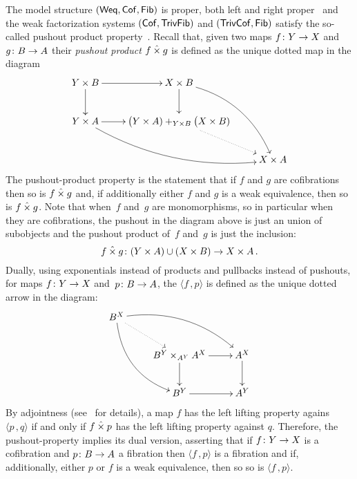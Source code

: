 \documentclass[reqno,10pt,a4paper,oneside,draft]{amsart}
\begin{document}
The model structure $(\mathsf{Weq}, \mathsf{Cof}, \mathsf{Fib})$ is proper, \ie both left and right proper~\cite[???]{henry2019qms}
and the weak factorization systems $(\mathsf{Cof}, \mathsf{TrivFib})$ and $(\mathsf{TrivCof}, \mathsf{Fib})$
satisfy the so-called pushout product property~\cite[???]{henry2018wms}. Recall that, given two maps $f \colon Y \rightarrow X$ and $g \colon B \rightarrow A$ their \emph{pushout product} $f \mathbin{\hat{\times}} g$ is defined as the unique dotted map in the diagram
\[
\xymatrix{
Y \times B \ar[r] \ar[d] &  X \times B \ar[d] \ar@/^1.5pc/[ddr] \\
Y \times A \ar[r]  \ar@/_1.5pc/[drr] & \displaystyle \big( Y \times A ) +_{Y \times B} \big( X \times B ) \ar@{.>}[dr]  \\
 & & X \times A }
 \]
The pushout-product property is  the statement that  if $f$ and $g$ are cofibrations then so is $f \mathbin{\hat{\times}} g$
and, if additionally either $f$ and $g$ is a weak equivalence, then so is $f \mathbin{\hat{\times}} g$.
Note that when~$f$ and~$g$ are monomorphisms, so in particular when they are cofibrations, the pushout in the diagram above is just an union of subobjects and the pushout product of~$f$ and~$g$ is just the inclusion:
\[  
f \mathbin{\hat{\times}} g \colon (Y \times A) \cup (X \times B) \rightarrow X \times A \, .
\]
Dually, using  exponentials instead of products and pullbacks instead of pushouts, for maps $f \colon Y \rightarrow X$ and~$p \colon B \rightarrow A$, the   $\langle f \, , p \rangle$ is defined as the unique dotted arrow in the diagram:
\[
\xymatrix{
 B^X \ar@{.>}[dr] \ar@/^1.5pc/[drr] \ar@/_1.5pc/[ddr] \\
& B^Y \times_{A^Y} A^X \ar[r] \ar[d] &  A^X \ar[d]  \\
& B^Y \ar[r] & A^Y  \\
 }
 \]
By adjointness (see~\cite{joyal-tierney-segal} for details), a map $f$ has the left lifting property agains $\langle p \, , q \rangle $ if and only if $f \mathbin{\hat{\times}} p$ has the left lifting property against $q$.
Therefore, the pushout-property  implies its dual version, asserting that  if $f \colon Y \to X$ is a cofibration and $p \colon B \to A$ a fibration then $\langle f \, , p \rangle$ is a fibration and if, additionally,  either $p$ or $f$ is a weak equivalence, then so so is $\langle f \, , p \rangle$.

\medskip
\end{document}
